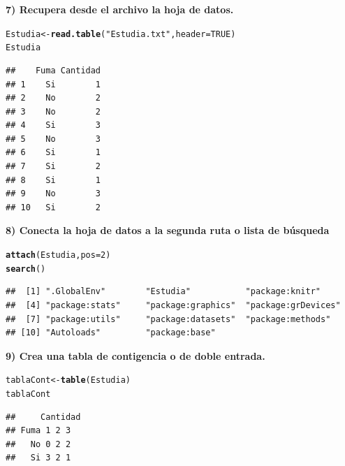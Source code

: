 \documentclass[12pt,letterpaper]{article}\usepackage[]{graphicx}\usepackage[]{color}
\makeatletter
\newcommand{\hlnum}[1]{\textcolor[rgb]{0.686,0.059,0.569}{#1}}%
\newcommand{\hlstr}[1]{\textcolor[rgb]{0.192,0.494,0.8}{#1}}%
\newcommand{\hlstd}[1]{\textcolor[rgb]{0.345,0.345,0.345}{#1}}%
\newcommand{\hlkwb}[1]{\textcolor[rgb]{0.69,0.353,0.396}{#1}}%
\newcommand{\hlkwc}[1]{\textcolor[rgb]{0.333,0.667,0.333}{#1}}%
\newcommand{\hlkwd}[1]{\textcolor[rgb]{0.737,0.353,0.396}{\textbf{#1}}}%
\newenvironment{kframe}{%
 \def\at@end@of@kframe{}%
 \ifinner\ifhmode%
  \def\at@end@of@kframe{\end{minipage}}%
  \begin{minipage}{\columnwidth}%
 \fi\fi%
 \def\FrameCommand##1{\hskip\@totalleftmargin \hskip-\fboxsep
 \colorbox{shadecolor}{##1}\hskip-\fboxsep
     \hskip-\linewidth \hskip-\@totalleftmargin \hskip\columnwidth}%
 \MakeFramed {\advance\hsize-\width
   \@totalleftmargin\z@ \linewidth\hsize
   \@setminipage}}%
 {\par\unskip\endMakeFramed%
 \at@end@of@kframe}
\newenvironment{knitrout}{}{} %
\makeatother
\begin{document}
\textbf {7) Recupera desde el archivo la hoja de datos.} 

\begin{knitrout}
\color{fgcolor}\begin{kframe}
\begin{alltt}
\hlstd{Estudia} \hlkwb{<-} \hlkwd{read.table}\hlstd{(}\hlstr{"Estudia.txt"}\hlstd{,} \hlkwc{header}\hlstd{=}\hlnum{TRUE}\hlstd{)}
\hlstd{Estudia}
\end{alltt}
\begin{verbatim}
##    Fuma Cantidad
## 1    Si        1
## 2    No        2
## 3    No        2
## 4    Si        3
## 5    No        3
## 6    Si        1
## 7    Si        2
## 8    Si        1
## 9    No        3
## 10   Si        2
\end{verbatim}
\end{kframe}
\end{knitrout}

\textbf {8) Conecta la hoja de datos a la segunda ruta o lista de b\'usqueda}

\begin{knitrout}
\color{fgcolor}\begin{kframe}
\begin{alltt}
\hlkwd{attach}\hlstd{(Estudia,} \hlkwc{pos}\hlstd{=}\hlnum{2}\hlstd{)}
\hlkwd{search}\hlstd{()}
\end{alltt}
\begin{verbatim}
##  [1] ".GlobalEnv"        "Estudia"           "package:knitr"    
##  [4] "package:stats"     "package:graphics"  "package:grDevices"
##  [7] "package:utils"     "package:datasets"  "package:methods"  
## [10] "Autoloads"         "package:base"
\end{verbatim}
\end{kframe}
\end{knitrout}

\textbf {9) Crea una tabla de contigencia o de doble entrada.} 

\begin{knitrout}
\color{fgcolor}\begin{kframe}
\begin{alltt}
\hlstd{tablaCont} \hlkwb{<-} \hlkwd{table}\hlstd{(Estudia)}
\hlstd{tablaCont}
\end{alltt}
\begin{verbatim}
##     Cantidad
## Fuma 1 2 3
##   No 0 2 2
##   Si 3 2 1
\end{verbatim}
\end{kframe}
\end{knitrout}
\end{document}
